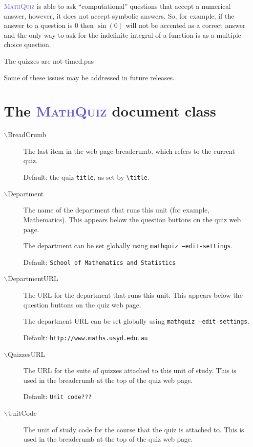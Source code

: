 \documentclass[svgnames]{article}
\def\MathQuiz{\textcolor{SlateBlue}{\textsc{MathQuiz}}\xspace}
\begin{document}
    \MathQuiz is able to ask ``computational'' questions that accept a
    numerical answer, however, it does not accept symbolic answers. So,
    for example, if the answer to a question is $0$ then $\sin(0)$ will
    not be accented as a correct answer and the only way to ask for the
    indefinite integral of a function is as a multiple choice question.

    The quizzes are not timed.pas

    Some of these issues may be addressed in future releases.

\section{The \MathQuiz document class}\label{S:documenntclass}

\begin{description}
  \item[$\backslash$BreadCrumb]
     The last item in the web page breadcrumb, which refers to the current quiz.

     Default: the quiz \texttt{title}, as set by \verb!\title!.

  \item[$\backslash$Department]
    The name of the department that runs this unit (for example,
    Mathematics). This appears below the question buttons on the quiz web
    page.

    The department can be set globally using \texttt{mathquiz --edit-settings}.

    Default: \texttt{School of Mathematics and Statistics}

  \item[$\backslash$DepartmentURL]
    The URL for the department that runs this unit. This appears below
    the question buttons on the quiz web page.

    The department URL can be set globally using \texttt{mathquiz --edit-settings}.

    Default: \texttt{http://www.maths.usyd.edu.au}

  \item[$\backslash$QuizzesURL]
    The URL for the suite of quizzes attached to this unit of study. This
    is used in the breadcrumb at the top of the quiz web page.

    Default: \texttt{Unit code???}

  \item[$\backslash$UnitCode]
    The unit of study code for the course that the quiz is attached
    to. This is used in the breadcrumb at the top of the quiz web page.


\end{description}
\end{document}
